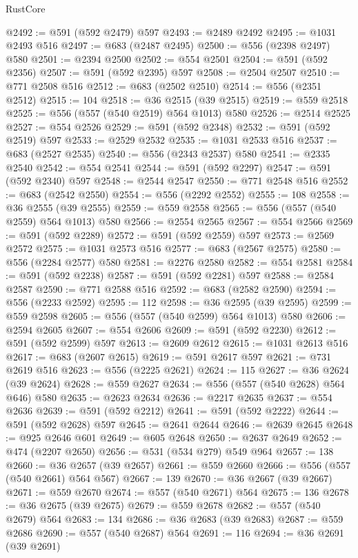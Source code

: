\begin{lexlean}{RustCore}
\begin{coremodule}
@2492 := @591 (@592 @2479) @597
@2493 := @2489 @2492
@2495 := @1031 @2493 @516
@2497 := @683 (@2487 @2495)
@2500 := @556 (@2398 @2497) @580
@2501 := @2394 @2500
@2502 := @554 @2501
@2504 := @591 (@592 @2356)
@2507 := @591 (@592 @2395) @597
@2508 := @2504 @2507
@2510 := @771 @2508 @516
@2512 := @683 (@2502 @2510)
@2514 := @556 (@2351 @2512)
@2515 := 104
@2518 := @36 @2515 (@39 @2515)
@2519 := @559 @2518
@2525 := @556 (@557 (@540 @2519) @564 @1013) @580
@2526 := @2514 @2525
@2527 := @554 @2526
@2529 := @591 (@592 @2348)
@2532 := @591 (@592 @2519) @597
@2533 := @2529 @2532
@2535 := @1031 @2533 @516
@2537 := @683 (@2527 @2535)
@2540 := @556 (@2343 @2537) @580
@2541 := @2335 @2540
@2542 := @554 @2541
@2544 := @591 (@592 @2297)
@2547 := @591 (@592 @2340) @597
@2548 := @2544 @2547
@2550 := @771 @2548 @516
@2552 := @683 (@2542 @2550)
@2554 := @556 (@2292 @2552)
@2555 := 108
@2558 := @36 @2555 (@39 @2555)
@2559 := @559 @2558
@2565 := @556 (@557 (@540 @2559) @564 @1013) @580
@2566 := @2554 @2565
@2567 := @554 @2566
@2569 := @591 (@592 @2289)
@2572 := @591 (@592 @2559) @597
@2573 := @2569 @2572
@2575 := @1031 @2573 @516
@2577 := @683 (@2567 @2575)
@2580 := @556 (@2284 @2577) @580
@2581 := @2276 @2580
@2582 := @554 @2581
@2584 := @591 (@592 @2238)
@2587 := @591 (@592 @2281) @597
@2588 := @2584 @2587
@2590 := @771 @2588 @516
@2592 := @683 (@2582 @2590)
@2594 := @556 (@2233 @2592)
@2595 := 112
@2598 := @36 @2595 (@39 @2595)
@2599 := @559 @2598
@2605 := @556 (@557 (@540 @2599) @564 @1013) @580
@2606 := @2594 @2605
@2607 := @554 @2606
@2609 := @591 (@592 @2230)
@2612 := @591 (@592 @2599) @597
@2613 := @2609 @2612
@2615 := @1031 @2613 @516
@2617 := @683 (@2607 @2615)
@2619 := @591 @2617 @597
@2621 := @731 @2619 @516
@2623 := @556 (@2225 @2621)
@2624 := 115
@2627 := @36 @2624 (@39 @2624)
@2628 := @559 @2627
@2634 := @556 (@557 (@540 @2628) @564 @646) @580
@2635 := @2623 @2634
@2636 := @2217 @2635
@2637 := @554 @2636
@2639 := @591 (@592 @2212)
@2641 := @591 (@592 @2222)
@2644 := @591 (@592 @2628) @597
@2645 := @2641 @2644
@2646 := @2639 @2645
@2648 := @925 @2646 @601
@2649 := @605 @2648
@2650 := @2637 @2649
@2652 := @474 (@2207 @2650)
@2656 := @531 (@534 @279) @549 @964
@2657 := 138
@2660 := @36 @2657 (@39 @2657)
@2661 := @559 @2660
@2666 := @556 (@557 (@540 @2661) @564 @567)
@2667 := 139
@2670 := @36 @2667 (@39 @2667)
@2671 := @559 @2670
@2674 := @557 (@540 @2671) @564
@2675 := 136
@2678 := @36 @2675 (@39 @2675)
@2679 := @559 @2678
@2682 := @557 (@540 @2679) @564
@2683 := 134
@2686 := @36 @2683 (@39 @2683)
@2687 := @559 @2686
@2690 := @557 (@540 @2687) @564
@2691 := 116
@2694 := @36 @2691 (@39 @2691)

\end{coremodule}
\end{lexlean}
